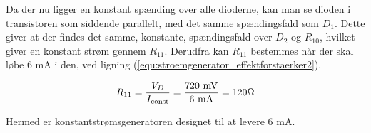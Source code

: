Da der nu ligger en konstant spænding over alle dioderne, kan man se dioden i transistoren som siddende parallelt, med det samme spændingsfald som $D_1$. Dette giver at der findes det samme, konstante, spændingsfald over $D_2$ og $R_{\mathrm{10}}$, hvilket giver en konstant strøm gennem $R_{\mathrm{11}}$. Derudfra kan $R_{\mathrm{11}}$ bestemmes når der skal løbe 6 mA i den, ved ligning (\ref{equ:stroemgenerator_effektforstaerker2}).

\begin{equation}
\label{equ:stroemgenerator_effektforstaerker2}
R_{\mathrm{11}} = \frac{V_{D}}{I_{\mathrm{const}}} = \mathrm{\frac{720~\mathrm{mV}}{6~\mathrm{mA}} = 120\ohm}
\end{equation}

Hermed er konstantstrømsgeneratoren designet til at levere 6 mA.
